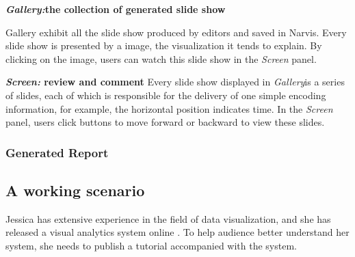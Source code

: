 \textbf{\textit{Gallery:}the collection of generated slide show}
 
Gallery exhibit all the slide show produced by editors and saved in Narvis. Every slide show is presented by a image, the visualization it tends to explain. By clicking on the image, users can watch this slide show in the \textit{Screen} panel. 

\textbf{\textit{Screen:}  review and comment}
Every slide show displayed in \textit{Gallery}is a series of slides, each of which is responsible for the delivery of one simple encoding information, for example, the horizontal position indicates time. In the \textit{Screen} panel, users click buttons to move forward or backward to view these slides. 
\subsubsection{Generated Report}

\subsection{A working scenario}
Jessica has extensive experience in the field of data visualization, and she has released a visual analytics system online . To help audience better understand her system, she needs to publish a tutorial accompanied with the system.


